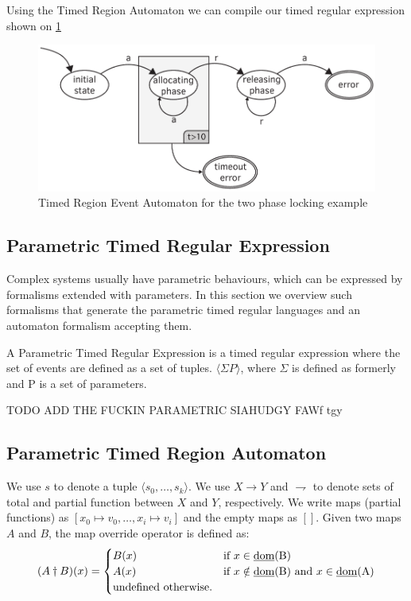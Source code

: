 				Using the Timed Region Automaton we can compile our timed regular expression shown on \cref{fig:cep:trea}
				
				\begin{figure}[h]
				\centering
				\includegraphics[width=0.7\linewidth]{include/figures/chapter_5/illustration_2}
				\caption{Timed Region Event Automaton for the two phase locking example}
				\label{fig:cep:trea}
				\end{figure}


			
		\subsection{Parametric Timed Regular Expression}
			Complex systems usually have parametric behaviours, which can be expressed by formalisms extended with parameters. In this section we overview such formalisms
			that generate the parametric timed regular languages and an automaton formalism accepting them.
			
			\begin{dfn}
			A Parametric Timed Regular Expression is a timed regular expression where the set of events are defined as a set of tuples. $\langle \Sigma P \rangle$,
			where $\Sigma$ is defined as formerly and P is a set of parameters.
			\end{dfn}
			
			TODO ADD THE FUCKIN PARAMETRIC SIAHUDGY FAWf tgy
		
			\subsection{Parametric Timed Region Automaton}
				
				
				We use $s$ to denote a tuple $\langle s_0,\dots,s_k \rangle$. We use $X \rightarrow Y$ and $\rightharpoondown$ to denote sets of total and partial function between
				$X$ and $Y$, respectively. We write maps (partial functions) as $[x_0 \mapsto v_0,\dots,x_i \mapsto v_i]$ and the empty maps as $[]$. Given two maps $A$ and $B$,
				the map override operator is defined as:
					\[
					 (A \dagger B)(x) = 
					  \begin{cases} 
					   B(x) & \text{if } x \in \text{\underline{dom}(B)} \\
					   A(x) & \text{if } x \notin \text{\underline{dom}(B)} \text{ and } x \in \text{\underline{dom}(A)} \\
					   \text{undefined otherwise.}
					  \end{cases}
					\]
					
